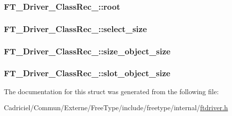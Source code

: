 \hypertarget{struct_f_t___driver___class_rec___a087ca3e2c562bb90b8af82b31e82d8c7}{
\subsubsection[{root}]{ F\-T\-\_\-\-Driver\-\_\-\-Class\-Rec\-\_\-\-::root}}\label{struct_f_t___driver___class_rec___a087ca3e2c562bb90b8af82b31e82d8c7}
\hypertarget{struct_f_t___driver___class_rec___a1b365eb82525dae0a816974d949fe0dd}{
\subsubsection[{select\-\_\-size}]{ F\-T\-\_\-\-Driver\-\_\-\-Class\-Rec\-\_\-\-::select\-\_\-size}}\label{struct_f_t___driver___class_rec___a1b365eb82525dae0a816974d949fe0dd}
\hypertarget{struct_f_t___driver___class_rec___a436687825ee47ed94da71fda90e2f578}{
\subsubsection[{size\-\_\-object\-\_\-size}]{ F\-T\-\_\-\-Driver\-\_\-\-Class\-Rec\-\_\-\-::size\-\_\-object\-\_\-size}}\label{struct_f_t___driver___class_rec___a436687825ee47ed94da71fda90e2f578}
\hypertarget{struct_f_t___driver___class_rec___adcce7eb86dd7c763b622818cfcde99a6}{
\subsubsection[{slot\-\_\-object\-\_\-size}]{ F\-T\-\_\-\-Driver\-\_\-\-Class\-Rec\-\_\-\-::slot\-\_\-object\-\_\-size}}\label{struct_f_t___driver___class_rec___adcce7eb86dd7c763b622818cfcde99a6}


The documentation for this struct was generated from the following file\-:\begin{DoxyCompactItemize}
\item 
Cadriciel/\-Commun/\-Externe/\-Free\-Type/include/freetype/internal/\hyperlink{ftdriver_8h}{ftdriver.\-h}\end{DoxyCompactItemize}
